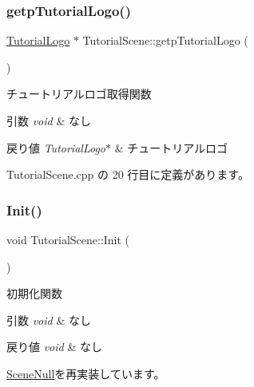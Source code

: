 \subsubsection{\texorpdfstring{getp\+Tutorial\+Logo()}{getpTutorialLogo()}}
{\footnotesize\ttfamily \mbox{\hyperlink{class_tutorial_logo}{Tutorial\+Logo}} $\ast$ Tutorial\+Scene\+::getp\+Tutorial\+Logo (\begin{DoxyParamCaption}{ }\end{DoxyParamCaption})}



チュートリアルロゴ取得関数 


\begin{DoxyParams}{引数}
{\em void} & なし \\
\hline
\end{DoxyParams}

\begin{DoxyRetVals}{戻り値}
{\em Tutorial\+Logo$\ast$} & チュートリアルロゴ \\
\hline
\end{DoxyRetVals}


 Tutorial\+Scene.\+cpp の 20 行目に定義があります。

\mbox{\label{class_tutorial_scene_a73023dcc6009590adb942c04631f3294}} 
\subsubsection{\texorpdfstring{Init()}{Init()}}
{\footnotesize\ttfamily void Tutorial\+Scene\+::\+Init (\begin{DoxyParamCaption}{ }\end{DoxyParamCaption})\hspace{0.3cm}{\ttfamily [virtual]}}



初期化関数 


\begin{DoxyParams}{引数}
{\em void} & なし \\
\hline
\end{DoxyParams}

\begin{DoxyRetVals}{戻り値}
{\em void} & なし \\
\hline
\end{DoxyRetVals}


\mbox{\hyperlink{class_scene_null_a6b27830a755687f2c00149bcfa739388}{Scene\+Null}}を再実装しています。



